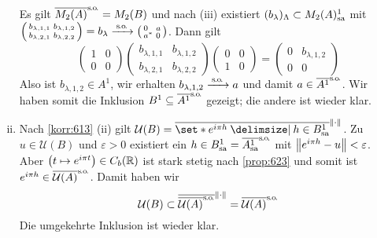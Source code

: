 \begin{beweis}
\begin{enumerate}[(i)]
		 Es gilt $\overline{M_2(A)}^\so=M_2(B)$ und nach (iii) existiert $(b_\lambda)_\Lambda \subset M_2(A)^1_\sa$ mit 
		 \(
		 	\begin{psmallmatrix}
		 		b_{\lambda,1,1} & b_{\lambda,1,2} \\
				b_{\lambda,2,1} & b_{\lambda,2,2}
		 	\end{psmallmatrix}
			=b_\lambda \grenzw{\so} \begin{psmallmatrix*}[l]
				0 & a \\
				a^* & 0
			\end{psmallmatrix*}
		 \).
		 Dann gilt
		 \[
		 	\begin{pmatrix}
		 		1 &0 \\
				0 & 0
		 	\end{pmatrix} 
			\begin{pmatrix}
		 		b_{\lambda,1,1} & b_{\lambda,1,2} \\
				b_{\lambda,2,1} & b_{\lambda,2,2}
			\end{pmatrix}
			\begin{pmatrix}
				0 & 0 \\
				1 & 0
			\end{pmatrix} =
			\begin{pmatrix}
				0 & b_{\lambda,1,2} \\
				0 & 0
			\end{pmatrix}
		 \]
		 Also ist $b_{\lambda,1,2} \in A^1$, wir erhalten $b_{\lambda,1,2} \grenzw{\so} a$ und damit $a \in \overline{A^1}^\so$.
		 Wir haben somit die Inklusion $B^1 \subseteq \overline{A^1}^\so$ gezeigt; die andere ist wieder klar.
		 \item Nach \autoref{korr:613} (ii) gilt $\mathcal{U}(B) = \overline{\set*{e^{i \pi h} \given h \in B^1_\sa}}^{\norm*{\cdot}}$.
		 Zu $u \in \mathcal{U}(B)$ und $\varepsilon>0$ existiert ein $h \in B^1_\sa=\overline{A^1_\sa}^\so$ mit $\norm*{e^{i \pi h}-u}<\varepsilon$.
		 Aber $\enbrace*{t \mapsto e^{i \pi t}} \in C_b(\mathbb{R})$ ist stark stetig nach \autoref{prop:623} und somit ist $e^{i \pi h} \in \overline{\mathcal{U}(A)}^\so$.
		 Damit haben wir
		 \[
		 	\mathcal{U}(B) \subset \overline{\overline{\mathcal{U}(A)}^\so}^{\norm*{\cdot}} = \overline{\mathcal{U}(A)}^\so
		 \]
		 Die umgekehrte Inklusion ist wieder klar. \qedhere
	\end{enumerate}
\end{beweis}
\newpage


